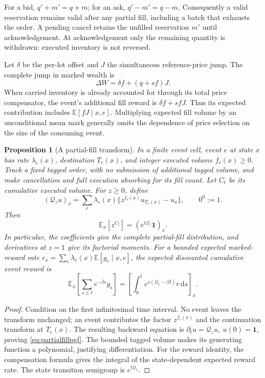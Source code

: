 \documentclass[11pt]{article}
\theoremstyle{plain}
\newtheorem{proposition}[theorem]{Proposition}
\theoremstyle{definition}
\theoremstyle{remark}
\newcommand{\E}{\mathbb E}
\newcommand{\dd}{\,\mathrm d}
\begin{document}
For a bid, \(q'+m'=q+m\); for an ask, \(q'-m'=q-m\).
Consequently a valid reservation remains valid after any partial
fill, including a batch that exhausts the order. A pending cancel
retains the unfilled reservation \(m'\) until acknowledgement.
At acknowledgement only the remaining quantity is withdrawn:
executed inventory is not reversed.

Let \(\delta\) be the per-lot offset and \(J\) the simultaneous
reference-price jump. The complete jump in marked wealth is
\[
 \Delta W=\delta f+(q+sf)J.
\]
When carried inventory is already accounted for through its
total price compensator, the event's additional fill reward is
\(\delta f+sfJ\). Thus its expected contribution includes
\(\E[fJ\mid x,e]\). Multiplying expected fill volume by an
unconditional mean mark generally omits the dependence of price
selection on the size of the consuming event.

\begin{proposition}[A partial-fill transform]
\label{prop:partialfilltransform}
In a finite event cell, event \(e\) at state \(x\) has rate
\(\lambda_e(x)\), destination \(T_e(x)\), and integer executed
volume \(f_e(x)\ge0\). Track a fixed tagged order, with no
submission of additional tagged volume, and make cancellation
and full execution absorbing for its fill count. Let \(C_t\)
be its cumulative executed volume. For \(z\ge0\), define
\[
 (\mathcal Q_z u)_x
 =\sum_e\lambda_e(x)
       \{z^{f_e(x)}u_{T_e(x)}-u_x\},
 \qquad 0^0:=1.
\]
Then
\begin{equation}\label{eq:partialfillpgf}
 \E_x[z^{C_t}]=(e^{t\mathcal Q_z}\mathbf1)_x .
\end{equation}
In particular, the coefficients give the complete partial-fill
distribution, and derivatives at \(z=1\) give its factorial
moments. For a bounded expected marked-reward rate
\(r_x=\sum_e\lambda_e(x)\E[g_e\mid x,e]\), the expected
discounted cumulative event reward is
\begin{equation}\label{eq:partialfillreward}
 \E_x\!\left[\sum_{s\le t}e^{-\beta s}g_s\right]
 =\left[\int_0^t e^{s(\mathcal Q_1-\beta I)}r\dd s\right]_x .
\end{equation}
\end{proposition}
\begin{proof}
Condition on the first infinitesimal time interval. No event leaves
the transform unchanged; an event contributes the factor
\(z^{f_e(x)}\) and the continuation transform at \(T_e(x)\).
The resulting backward equation is
\(\partial_t u=\mathcal Q_z u,\ u(0)=\mathbf1\), proving
\eqref{eq:partialfillpgf}. The bounded tagged volume makes its
generating function a polynomial, justifying differentiation.
For the reward identity, the compensation formula gives the
integral of the state-dependent expected reward rate.
The state transition semigroup is \(e^{t\mathcal Q_1}\).
\end{proof}
\end{document}
